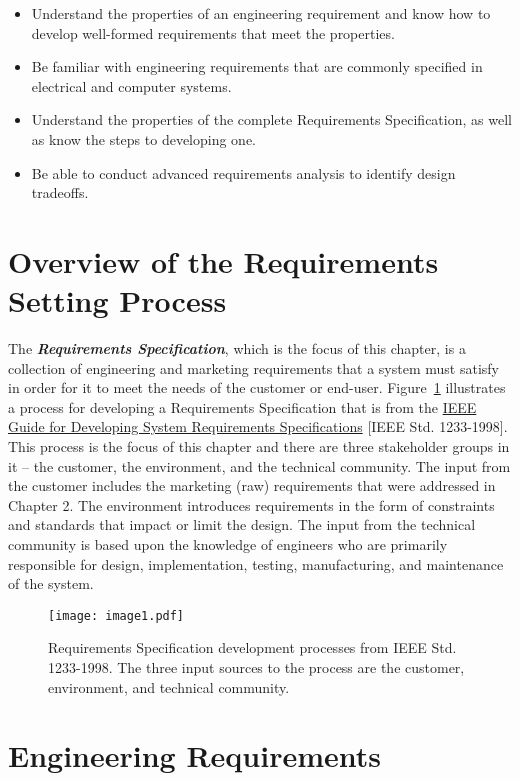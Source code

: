 \begin{itemize}
\item
  Understand the properties of an engineering requirement and know how
  to develop well-formed requirements that meet the properties.
\item
  Be familiar with engineering requirements that are commonly specified
  in electrical and computer systems.
\item
  Understand the properties of the complete Requirements Specification,
  as well as know the steps to developing one.
\item
  Be able to conduct advanced requirements analysis to identify design
  tradeoffs.
\end{itemize}

\section{Overview of the Requirements Setting Process}
\label{section':overview-of-the-requirements-setting-process}

The \emph{\textbf{Requirements Specification}}, which is the focus of
this chapter, is a collection of engineering and marketing requirements
that a system must satisfy in order for it to meet the needs of the
customer or end-user. Figure~\ref{figure: ieeeRequirements} 
illustrates a process for developing a
Requirements Specification that is from the \ul{IEEE Guide for
Developing System Requirements Specifications} {[}IEEE Std.
1233-1998{]}. This process is the focus of this chapter and there are
three stakeholder groups in it -- the customer, the environment, and the
technical community. The input from the customer includes the marketing
(raw) requirements that were addressed in Chapter 2. The environment
introduces requirements in the form of constraints and standards that
impact or limit the design. The input from the technical community is
based upon the knowledge of engineers who are primarily responsible for
design, implementation, testing, manufacturing, and maintenance of the
system.

\begin{figure}
\texttt{[image: image1.pdf]}
\caption{Requirements Specification development processes
from IEEE Std. 1233-1998. The three input sources to the process are the
customer, environment, and technical community.}
\label{figure: ieeeRequirements}
\end{figure}

\section{Engineering Requirements}
\label{section:engineering-requirements}

